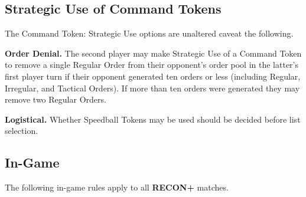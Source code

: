 \documentclass[14pt,dvipsnames]{extarticle}
\newcommand{\missionrule}[1]{\noindent\textbf{#1}\xspace}
\newenvironment{squishitemize}
{\begin{list}{$\bullet$}{%
    \setlength{\itemsep}{2pt}%
    \setlength{\parsep}{2pt}%
    \setlength{\topsep}{2pt}%
    \setlength{\parskip}{0pt} %
    \renewcommand{\labelitemi}{--}}}
  {\end{list}}
\newcommand{\reconplus}{\textbf{RECON+}\xspace}
\begin{document}



\subsection{Strategic Use of Command Tokens}

The Command Token: Strategic Use options are unaltered caveat the
following.

\missionrule{Order Denial.} The second player may make Strategic Use
of a Command Token to remove a single Regular Order from their
opponent's order pool in the latter's first player turn if their
opponent generated ten orders or less (including Regular, Irregular,
and Tactical Orders).  If more than ten orders were generated they may
remove two Regular Orders.

\missionrule{Logistical.} Whether Speedball Tokens may be used should
be decided before list selection.


\subsection{In-Game}

The following in-game rules apply to all \reconplus matches.

\end{document}
